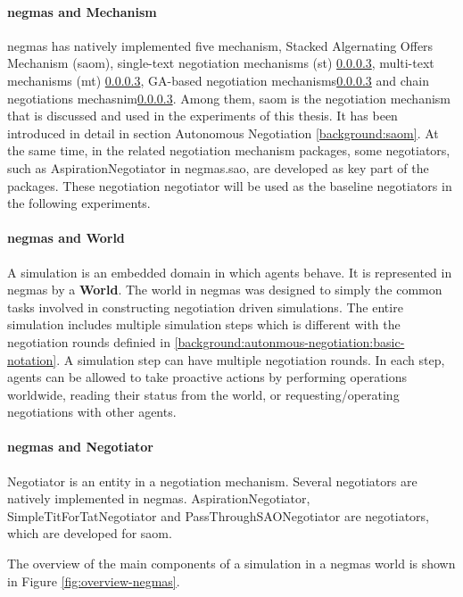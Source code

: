 \paragraph{\gls{negmas} and Mechanism}
\gls{negmas} has natively implemented five mechanism, Stacked Algernating Offers Mechanism (\gls{saom}), single-text negotiation mechanisms (st) \ref{}, multi-text mechanisms (mt) \ref{}, GA-based negotiation mechanisms\ref{} and chain negotiations mechasnim\ref{}. Among them, \gls{saom} is the negotiation mechanism that is discussed and used in the experiments of this thesis. It has been introduced in detail in section Autonomous Negotiation \ref{background:saom}. At the same time, in the related negotiation mechanism packages, some negotiators, such as AspirationNegotiator in negmas.sao, are developed as key part of the packages. These negotiation negotiator will be used as the baseline negotiators in the following experiments.
\paragraph{\gls{negmas} and World}
A simulation is an embedded domain in which agents behave. It is represented in \gls{negmas} by a \textbf{World}. The world in \gls{negmas} was designed to simply the common tasks involved in constructing negotiation driven simulations\parencite{Mohammad2019}. The entire simulation includes multiple simulation steps which is different with the negotiation rounds definied in \ref{background:autonmous-negotiation:basic-notation}. A simulation step can have multiple negotiation rounds. In each step, agents can be allowed to take proactive actions by performing operations worldwide, reading their status from the world, or requesting/operating negotiations with other agents.
\paragraph{\gls{negmas} and Negotiator} Negotiator is an entity in a negotiation mechanism. Several negotiators are natively implemented in \gls{negmas}. AspirationNegotiator, SimpleTitForTatNegotiator and PassThroughSAONegotiator are negotiators, which are developed for \gls{saom}.

The overview of the main components of a simulation in a \gls{negmas} world is shown in Figure \ref{fig:overview-negmas}.

